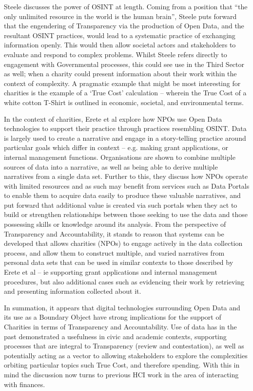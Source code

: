 Steele discusses the power of OSINT at length. Coming from a position that ``the only unlimited resource in the world is the human brain'', Steele puts forward that the engendering of Transparency via the production of Open Data, and the resultant OSINT practices, would lead to a systematic practice of exchanging information openly. This would then allow societal actors and stakeholders to evaluate and respond to complex problems. Whilst Steele refers directly to engagement with Governmental processes, this could see use in the Third Sector as well; when a charity could present information about their work within the context of complexity. A pragmatic example that might be most interesting for charities is the example of a `True Cost' calculation --  wherein the True Cost of a white cotton T-Shirt is outlined in economic, societal, and environmental terms.

In the context of charities, Erete et al explore how NPOs use Open Data technologies to support their practice through practices resembling OSINT. Data is largely used to create a narrative and engage in a story-telling practice around particular goals which differ in context -- e.g. making grant applications, or internal management functions. Organisations are shown to combine multiple sources of data into a narrative, as well as being able to derive multiple narratives from a single data set. Further to this, they discuss how NPOs operate with limited resources and as such may benefit from services such as Data Portals to enable them to acquire data easily to produce these valuable narratives, and put forward that additional value is created via such portals when they act to build or strengthen relationships between those seeking to use the data and those possessing skills or knowledge around its analysis. From the perspective of Transparency and Accountability, it stands to reason that systems can be developed that allows charities (NPOs) to engage actively in the data collection process, and allow them to construct multiple, and varied narratives from personal data sets that can be used in similar contexts to those described by Erete et al -- ie supporting grant applications and internal management procedures, but also additional cases such as evidencing their work by retrieving and presenting information collected about it.

In summation, it appears that digital technologies surrounding Open Data and its use as a Boundary Object have strong implications for the support of Charities in terms of Transparency and Accountability. Use of data has in the past demonstrated a usefulness in civic and academic contexts, supporting processes that are integral to Transparency (review and contestation), as well as potentially acting as a vector to allowing stakeholders to explore the complexities orbiting particular topics such True Cost, and therefore spending. With this in mind the discussion now turns to previous HCI work in the area of interacting with finances.


